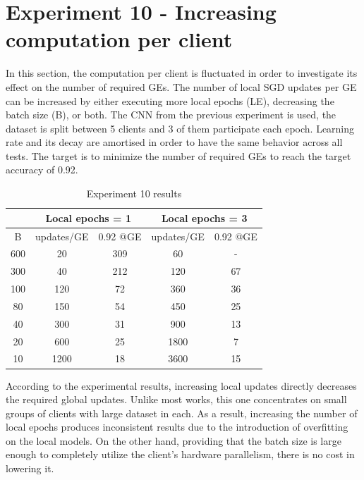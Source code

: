 \section{Experiment 10 - Increasing computation per client}
    In this section, the computation per client is fluctuated in order to investigate its effect on the number of required GEs. The number of local SGD updates per GE can be increased by either executing more local epochs (LE), decreasing the batch size (B), or both. The CNN from the previous experiment is used, the dataset is split between 5 clients and 3 of them participate each epoch. Learning rate and its decay are amortised in order to have the same behavior across all tests. The target is to minimize the number of required GEs to reach the target accuracy of 0.92.

\begin{table}
    \center
    \begin{tabular}{ | c | c c | c c | }
        \hline
        & \multicolumn{2}{|c|}{Local epochs = 1} & \multicolumn{2}{|c|}{Local epochs = 3} \\\hline
        B & updates/GE &  0.92 @GE & updates/GE &  0.92 @GE\\\hline
        600 & 20 & 309 & 60 & -\\
        300 & 40 & 212 & 120 & 67\\
        100 & 120 & 72 & 360 & 36\\
        80 & 150 & 54 & 450 & 25\\
        40 & 300 & 31 & 900 & 13\\
        20 & 600 & 25 & 1800 & 7\\
        10 & 1200 & 18 & 3600 & 15\\\hline
    \end{tabular}
    \caption{Experiment 10 results}
\end{table}

According to the experimental results, increasing local updates directly decreases the required global updates. Unlike most works, this one concentrates on small groups of clients with large dataset in each. As a result, increasing the number of local epochs produces inconsistent results due to the introduction of overfitting on the local models. On the other hand, providing that the batch size is large enough to completely utilize the client's hardware parallelism, there is no cost in lowering it.